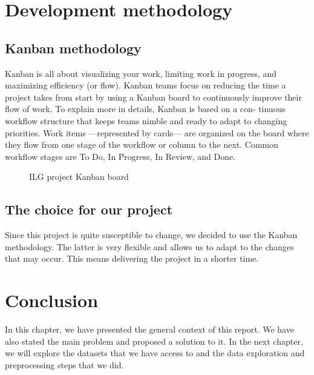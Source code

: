 \section{Development methodology}
\subsection{Kanban methodology}
Kanban is all about visualizing your work, limiting work in progress, and
maximizing efficiency (or flow). Kanban teams focus on reducing the time a
project takes from start by using a Kanban board to continuously improve
their flow of work. To explain more in details, Kanban is based on a con-
tinuous workflow structure that keeps teams nimble and ready to adapt to
changing priorities. Work items —represented by cards— are organized on
the board where they flow from one stage of the workflow or column to the
next. Common workflow stages are To Do, In Progress, In Review, and
Done.

\begin{figure}[H]
    \centering
    \caption{ILG project Kanban board}
    \label{fig:ilg-project-kanban-board}
\end{figure}

\subsection{The choice for our project}
Since this project is quite susceptible to change, we decided to use the Kanban methodology. The latter is very flexible and allows us to adapt to the changes that may occur. This means delivering the project in a shorter time.


\setcounter{secnumdepth}{0} %
\section{Conclusion}
In this chapter, we have presented the general context of this report. We have also stated the main problem and proposed a solution to it. In the next chapter, we will explore the datasets that we have access to and the data exploration and preprocessing steps that we did.
